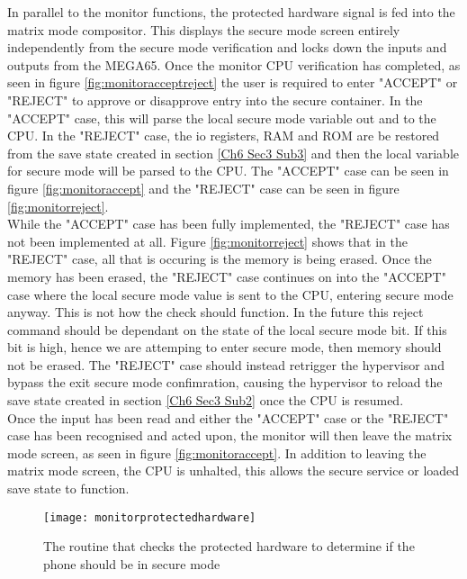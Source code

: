 In parallel to the monitor functions, the protected hardware signal is fed into the matrix mode compositor. This displays the secure mode screen entirely independently from the secure mode verification and locks down the inputs and outputs from the MEGA65. Once the monitor CPU verification has completed, as seen in figure \ref{fig:monitoracceptreject} the user is required to enter "ACCEPT" or "REJECT" to approve or disapprove entry into the secure container. In the "ACCEPT" case, this will parse the local secure mode variable out and to the CPU. In the "REJECT" case, the io registers, RAM and ROM are be restored from the save state created in section \ref{Ch6 Sec3 Sub3} and then the local variable for secure mode will be parsed to the CPU. The "ACCEPT" case can be seen in figure \ref{fig:monitoraccept} and the "REJECT" case can be seen in figure \ref{fig:monitorreject}.\\

While the "ACCEPT" case has been fully implemented, the "REJECT" case has not been implemented at all. Figure \ref{fig:monitorreject} shows that in the "REJECT" case, all that is occuring is the memory is being erased. Once the memory has been erased, the "REJECT" case continues on into the "ACCEPT" case where the local secure mode value is sent to the CPU, entering secure mode anyway. This is not how the check should function. In the future this reject command should be dependant on the state of the local secure mode bit. If this bit is high, hence we are attemping to enter secure mode, then memory should not be erased. The "REJECT" case should instead retrigger the hypervisor and bypass the exit secure mode confimration, causing the hypervisor to reload the save state created in section \ref{Ch6 Sec3 Sub2} once the CPU is resumed.\\

Once the input has been read and either the "ACCEPT" case or the "REJECT" case has been recognised and acted upon, the monitor will then leave the matrix mode screen, as seen in figure \ref{fig:monitoraccept}. In addition to leaving the matrix mode screen, the CPU is unhalted, this allows the secure service or loaded save state to function.

\begin{figure}
  \centering
  \texttt{[image: monitorprotectedhardware]}
  \caption{The routine that checks the protected hardware to determine if the phone should be in secure mode}
  \label{fig:monitorprotectedhardware}
\end{figure}

